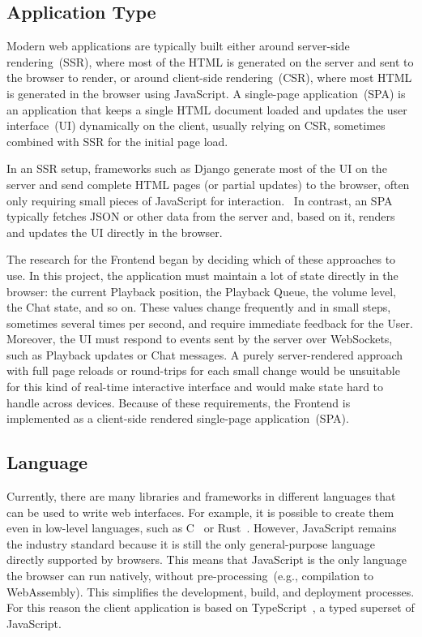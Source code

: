 \subsection{Application Type}
Modern web applications are typically built either around
server-side rendering~(SSR), where most of the HTML is generated on
the server and sent to the browser to render,
or around client-side rendering~(CSR), where most HTML is generated in the
browser using JavaScript.
A single-page application~(SPA) is an application that keeps a single HTML
document loaded and updates the user interface~(UI) dynamically on the client,
usually relying on CSR, sometimes combined with SSR for the initial page load.

In an SSR setup, frameworks such as Django generate most of the UI
on the server and send complete HTML pages (or partial updates) to the browser,
often only requiring small pieces of JavaScript for interaction.~\parencite{django_html}
In contrast, an SPA typically fetches JSON or other data from the server and,
based on it, renders and updates the UI directly in the browser.~\parencite{spa}

The research for the Frontend began by deciding which of these approaches to use.
In this project, the application must maintain a lot of state directly in the
browser: the current Playback position, the Playback Queue, the volume level,
the Chat state, and so on.
These values change frequently and in small steps, sometimes several times per
second, and require immediate feedback for the User.
Moreover, the UI must respond to events sent by
the server over WebSockets, such as Playback updates or Chat messages.
A purely server-rendered approach with full page reloads or round-trips for
each small change would be unsuitable for this kind of real-time interactive
interface and would make state hard to handle across devices.
Because of these requirements, the Frontend is implemented as a
client-side rendered single-page application~(SPA).

\subsection{Language}
Currently, there are many libraries and frameworks in different languages
that can be used to write web interfaces.
For example, it is possible to create them even in low-level languages,
such as C~\parencite{clay_lib} or Rust~\parencite{yew_framework}.
However, JavaScript remains the industry standard because it is still the only
general-purpose language directly supported by browsers.
This means that JavaScript is the only language the browser can run natively, without
pre-processing~(e.g., compilation to WebAssembly). This simplifies the development, build,
and deployment processes. For this reason the
client application is based on TypeScript~\parencite{typescript}, a typed superset of JavaScript.


